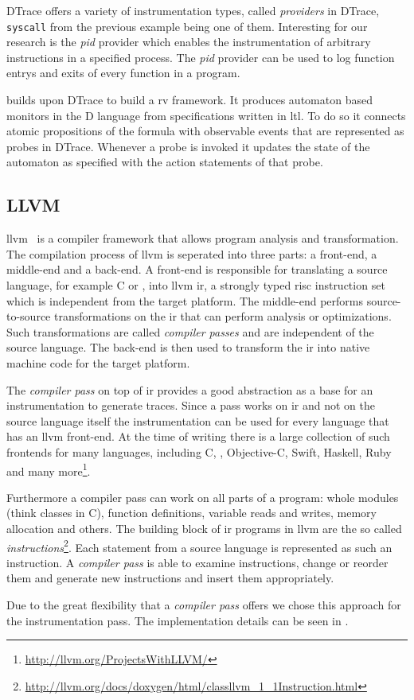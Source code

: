 DTrace offers a variety of instrumentation types, called \emph{providers} in DTrace, \lstinline{syscall} from the previous example being one of them.
Interesting for our research is the \emph{pid} provider which enables the instrumentation of arbitrary instructions in a specified process.
The \emph{pid} provider can be used to log function entrys and exits of every function in a program.

\Cite{Rosenberg2016} builds upon DTrace to build a \gls{rv} framework.
It produces automaton based monitors in the D language from specifications written in \gls{ltl}.
To do so it connects atomic propositions of the formula with observable events that are represented as probes in DTrace.
Whenever a probe is invoked it updates the state of the automaton as specified with the action statements of that probe.

\subsection{LLVM}
\label{sec:related:traces:llvm}

\Gls{llvm}~\cite{Lattner2004} is a compiler framework that allows program analysis and transformation.
The compilation process of \gls{llvm} is seperated into three parts: a front-end, a middle-end and a back-end.
A front-end is responsible for translating a source language, for example C or \CC, into \gls{llvm} \gls{ir}, a strongly typed \gls{risc} instruction set which is independent from the target platform.
The middle-end performs source-to-source transformations on the \gls{ir} that can perform analysis or optimizations.
Such transformations are called \emph{compiler passes} and are independent of the source language.
The back-end is then used to transform the \gls{ir} into native machine code for the target platform.

The \emph{compiler pass} on top of \gls{ir} provides a good abstraction as a base for an instrumentation to generate traces.
Since a pass works on \gls{ir} and not on the source language itself the instrumentation can be used for every language that has an \gls{llvm} front-end.
At the time of writing there is a large collection of such frontends for many languages, including C, \CC, Objective-C, Swift, Haskell, Ruby and many more\footnote{\url{http://llvm.org/ProjectsWithLLVM/}}.

Furthermore a compiler pass can work on all parts of a program: whole modules (think classes in C), function definitions, variable reads and writes, memory allocation and others.
The building block of \gls{ir} programs in \gls{llvm} are the so called \emph{instructions}\footnote{\url{http://llvm.org/docs/doxygen/html/classllvm_1_1Instruction.html}}.
Each statement from a source language is represented as such an instruction.
A \emph{compiler pass} is able to examine instructions, change or reorder them and generate new instructions and insert them appropriately.

Due to the great flexibility that a \emph{compiler pass} offers we chose this approach for the instrumentation pass.
The implementation details can be seen in .

